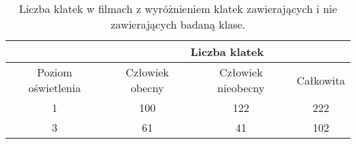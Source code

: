 \begin{table}[H]
    \centering
    \caption{Liczba klatek w filmach z wyróżnieniem klatek zawierających i nie zawierających badaną klase.}
    \begin{tabular}{c|ccc|}
    \cline{2-4}
                                             & \multicolumn{3}{c|}{Liczba klatek}                                                         \\ \hline
    \multicolumn{1}{|c|}{Poziom oświetlenia} & \multicolumn{1}{c|}{Człowiek obecny} & \multicolumn{1}{c|}{Człowiek nieobecny} & Całkowita \\ \hline
    \multicolumn{1}{|c|}{1}                  & \multicolumn{1}{c|}{100}             & \multicolumn{1}{c|}{122}                & 222       \\ \hline
    \multicolumn{1}{|c|}{3}                  & \multicolumn{1}{c|}{61}              & \multicolumn{1}{c|}{41}                 & 102       \\ \hline
    \end{tabular}
    \label{tab:liczba-klatek}
    \end{table}